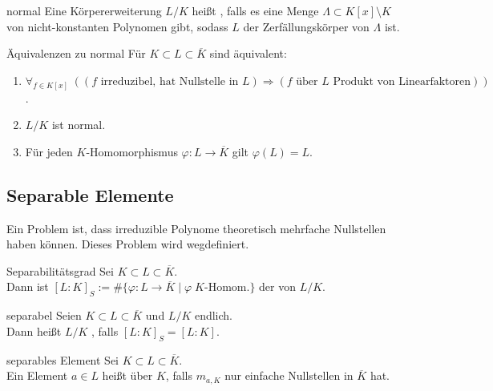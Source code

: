 \begin{Def}{normal}
    Eine Körpererweiterung $L/K$ heißt , falls
    es eine Menge $\Lambda \subset K[x] \setminus K$ von nicht-konstanten
    Polynomen gibt, sodass $L$ der Zerfällungskörper von $\Lambda$ ist.
\end{Def}

\begin{Prop}{Äquivalenzen zu normal}
    Für $K \subset L \subset \overline{K}$ sind äquivalent:
    \begin{enumerate}[label=(\alph*)]
        \item
        $\forall_{f \in K[x]}\;
        ((f \text{ irreduzibel, hat Nullstelle in } L) \Rightarrow
        (f \text{ über } L \text{ Produkt von Linearfaktoren}))$.
        
        \item
        $L/K$ ist normal.
        
        \item
        Für jeden $K$-Homomorphismus $\varphi\colon L \rightarrow \overline{K}$
        gilt $\varphi(L) = L$.
    \end{enumerate}
\end{Prop}

\subsection{%
    Separable Elemente%
}

\begin{Bem}
    Ein Problem ist, dass irreduzible Polynome theoretisch mehrfache
    Nullstellen haben können.
    Dieses Problem wird wegdefiniert.
\end{Bem}

\begin{Def}{Separabilitätsgrad}
    Sei $K \subset L \subset \overline{K}$.\\
    Dann ist
    $[L:K]_S := \#\{\varphi\colon L \rightarrow \overline{K} \;|\;
    \varphi\; K\text{-Homom.}\}$
    der  von $L/K$.
\end{Def}

\begin{Def}{separabel}
    Seien $K \subset L \subset \overline{K}$ und $L/K$ endlich.\\
    Dann heißt $L/K$ , falls $[L:K]_S = [L:K]$.
\end{Def}

\begin{Def}{separables Element}
    Sei $K \subset L \subset \overline{K}$.\\
    Ein Element $a \in L$ heißt  über $K$, falls
    $m_{a,K}$ nur einfache Nullstellen in $\overline{K}$ hat.
\end{Def}

